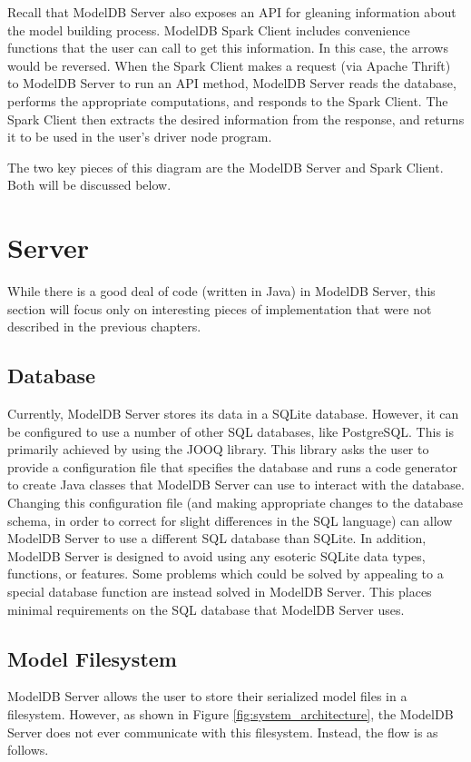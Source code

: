 Recall that ModelDB Server also exposes an API for gleaning information about the model building process.
ModelDB Spark Client includes convenience functions that the user can call to get this information. In this case,
the arrows would be reversed. When the Spark Client makes a request (via Apache Thrift) to ModelDB Server to run an API 
method, ModelDB Server reads the database, performs the appropriate computations, and responds to the Spark Client. The
Spark Client then extracts the desired information from the response, and returns it to be used in the user's driver node
program.

The two key pieces of this diagram are the ModelDB Server and Spark Client. Both
will be discussed below.

\section{Server}
While there is a good deal of code (written in Java) in ModelDB Server, this section will focus only
on interesting pieces of implementation that were not described in the previous chapters.

\subsection{Database}
Currently, ModelDB Server stores its data in a SQLite database. However, it can be
configured to use a number of other SQL databases, like PostgreSQL. This is primarily
achieved by using the JOOQ library. This library asks the user to provide a configuration
file that specifies the database and runs a code generator to create Java classes that
ModelDB Server can use to interact with the database. Changing this configuration file
(and making appropriate changes to the database schema, in order to correct for slight differences
in the SQL language) can allow ModelDB Server to use a different SQL database than
SQLite. In addition, ModelDB Server is designed to avoid using any esoteric SQLite data types,
functions, or features. Some problems which could be solved by appealing to a special 
database function are instead solved in ModelDB Server. This places minimal requirements on 
the SQL database that ModelDB Server uses.

\subsection{Model Filesystem}
ModelDB Server allows the user to store their serialized model files in a filesystem. However,
as shown in Figure \ref{fig:system_architecture}, the ModelDB Server does not ever communicate with this
filesystem. Instead, the flow is as follows.

